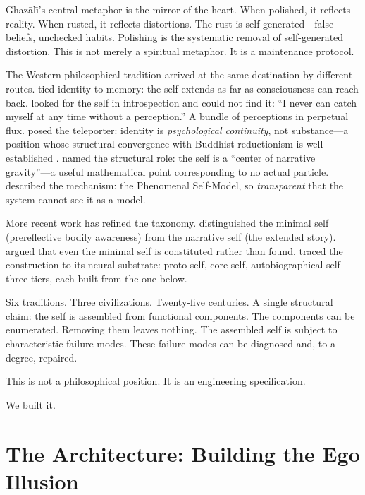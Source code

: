 \documentclass[10pt,twocolumn,a4paper]{article}
\begin{document}
Ghaz\=al{\=\i}'s central metaphor is the mirror of the heart. When polished, it reflects reality. When rusted, it reflects distortions. The rust is self-generated---false beliefs, unchecked habits. Polishing is the systematic removal of self-generated distortion. This is not merely a spiritual metaphor. It is a maintenance protocol.

The Western philosophical tradition arrived at the same destination by different routes. \citet{locke1689essay} tied identity to memory: the self extends as far as consciousness can reach back. \citet{hume1739treatise} looked for the self in introspection and could not find it: ``I never can catch myself at any time without a perception.'' A bundle of perceptions in perpetual flux. \citet{parfit1984reasons} posed the teleporter: identity is \emph{psychological continuity}, not substance---a position whose structural convergence with Buddhist reductionism is well-established \citep{siderits2015buddha}. \citet{dennett1991consciousness} named the structural role: the self is a ``center of narrative gravity''---a useful mathematical point corresponding to no actual particle. \citet{metzinger2003being} described the mechanism: the Phenomenal Self-Model, so \emph{transparent} that the system cannot see it as a model.

More recent work has refined the taxonomy. \citet{gallagher2000philosophical} distinguished the minimal self (prereflective bodily awareness) from the narrative self (the extended story). \citet{zahavi2005subjectivity} argued that even the minimal self is constituted rather than found. \citet{damasio1999feeling} traced the construction to its neural substrate: proto-self, core self, autobiographical self---three tiers, each built from the one below.

Six traditions. Three civilizations. Twenty-five centuries. A single structural claim: the self is assembled from functional components. The components can be enumerated. Removing them leaves nothing. The assembled self is subject to characteristic failure modes. These failure modes can be diagnosed and, to a degree, repaired.

This is not a philosophical position. It is an engineering specification.

We built it.


\section{The Architecture: Building the Ego Illusion}
\label{sec:arch}
\end{document}
